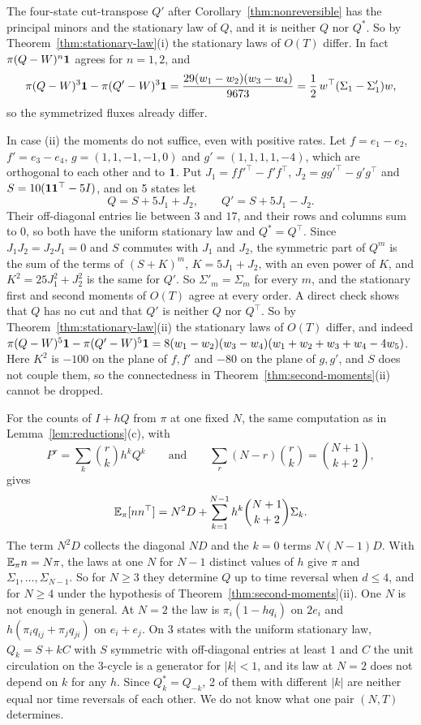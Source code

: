 The four-state cut-transpose $Q'$ after Corollary~\ref{thm:nonreversible} has the principal minors
and the stationary law of $Q$, and it is neither $Q$ nor $Q^*$. So by
Theorem~\ref{thm:stationary-law}(i) the stationary laws of $O(T)$ differ. In fact
$\pi(Q-W)^n\mathbf{1}$ agrees for $n=1,2$, and
\[
 \pi(Q-W)^3\mathbf{1}-\pi(Q'-W)^3\mathbf{1}=\frac{29(w_1-w_2)(w_3-w_4)}{9673}
 =\frac12\,w^\top(\Sigma_1-\Sigma'_1)w ,
\]
so the symmetrized fluxes already differ.

\begin{remark}\label{rem:nocut-moments}
In case (ii) the moments do not suffice, even with positive rates. Let $f=e_1-e_2$,
$f'=e_3-e_4$, $g=(1,1,-1,-1,0)$ and $g'=(1,1,1,1,-4)$, which are orthogonal to each other and to
$\mathbf{1}$. Put $J_1=ff'^\top-f'f^\top$, $J_2=gg'^\top-g'g^\top$ and
$S=10(\mathbf{1}\mathbf{1}^\top-5I)$, and on 5 states let
\[
 Q=S+5J_1+J_2,\qquad Q'=S+5J_1-J_2 .
\]
Their off-diagonal entries lie between $3$ and $17$, and their rows and columns sum to $0$, so both
have the uniform stationary law and $Q^*=Q^\top$. Since $J_1J_2=J_2J_1=0$ and $S$ commutes with
$J_1$ and $J_2$, the symmetric part of $Q^m$ is the sum of the terms of $(S+K)^m$, $K=5J_1+J_2$,
with an even power of $K$, and $K^2=25J_1^2+J_2^2$ is the same for $Q'$. So $\Sigma'_m=\Sigma_m$
for every $m$, and the stationary first and second moments of $O(T)$ agree at every order. A
direct check shows that $Q$ has no cut and that $Q'$ is neither $Q$ nor $Q^\top$. So by
Theorem~\ref{thm:stationary-law}(ii) the stationary laws of $O(T)$ differ, and indeed
$\pi(Q-W)^5\mathbf{1}-\pi(Q'-W)^5\mathbf{1}=8(w_1-w_2)(w_3-w_4)(w_1+w_2+w_3+w_4-4w_5)$. Here $K^2$ is
$-100$ on the plane of $f,f'$ and $-80$ on the plane of $g,g'$, and $S$ does not couple them, so
the connectedness in Theorem~\ref{thm:second-moments}(ii) cannot be dropped.
\end{remark}

\begin{remark}\label{rem:one-N}
For the counts of $I+hQ$ from $\pi$ at one fixed $N$, the same computation as in
Lemma~\ref{lem:reductions}(c), with
\[
 P^r=\sum_k\binom rkh^kQ^k\qquad\text{and}\qquad\sum_{r}(N-r)\binom rk=\binom{N+1}{k+2},
\]
gives
\[
 \mathbb{E}_\pi[nn^\top]=N^2D+\sum_{k=1}^{N-1}h^k\binom{N+1}{k+2}\Sigma_k .
\]
The term $N^2D$ collects the diagonal $ND$ and the $k=0$ terms $N(N-1)D$. With $\mathbb{E}_\pi n=N\pi$,
the laws at one $N$ for $N-1$ distinct values of $h$ give $\pi$ and $\Sigma_1,\dots,\Sigma_{N-1}$.
So for $N\ge3$ they determine $Q$ up to time reversal when $d\le4$, and for $N\ge4$ under the
hypothesis of Theorem~\ref{thm:second-moments}(ii). One $N$ is not enough in general. At $N=2$
the law is $\pi_i(1-hq_i)$ on $2e_i$ and $h(\pi_iq_{ij}+\pi_jq_{ji})$ on $e_i+e_j$. On 3 states
with the uniform stationary law, $Q_k=S+kC$ with $S$ symmetric with off-diagonal entries at least
$1$ and $C$ the unit circulation on the 3-cycle is a generator for $|k|<1$, and its law at $N=2$
does not depend on $k$ for any $h$. Since $Q_k^*=Q_{-k}$, 2 of them with different $|k|$ are
neither equal nor time reversals of each other. We do not know what one pair $(N,T)$
determines.
\end{remark}

